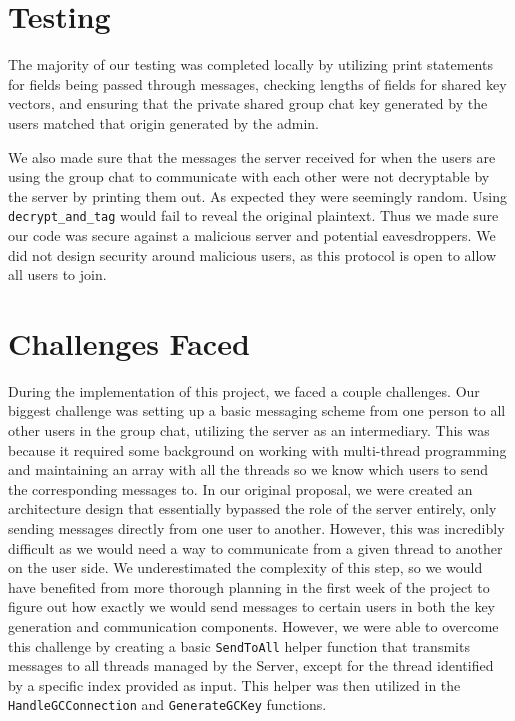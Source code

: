 \documentclass[sigconf]{acmart}
\begin{document}
\section{Testing}
The majority of our testing was completed locally by utilizing print statements for fields being passed through messages, checking lengths of fields for shared key vectors, and ensuring that the private shared group chat key generated by the users matched that origin generated by the admin.

We also made sure that the messages the server received for when the users are using the group chat to communicate with each other were not decryptable by the server by printing them out. As expected they were seemingly random. Using \texttt{decrypt\_and\_tag} would fail to reveal the original plaintext. Thus we made sure our code was secure against a malicious server and potential eavesdroppers. We did not design security around malicious users, as this protocol is open to allow all users to join. 

\section{Challenges Faced}
During the implementation of this project, we faced a couple challenges. Our biggest challenge was setting up a basic messaging scheme from one person to all other users in the group chat, utilizing the server as an intermediary. This was because it required some background on working with multi-thread programming and maintaining an array with all the threads so we know which users to send the corresponding messages to. In our original proposal, we were created an architecture design that essentially bypassed the role of the server entirely, only sending messages directly from one user to another. However, this was incredibly difficult as we would need a way to communicate from a given thread to another on the user side. We underestimated the complexity of this step, so we would have benefited from more thorough planning in the first week of the project to figure out how exactly we would send messages to certain users in both the key generation and communication components. However, we were able to overcome this challenge by creating a basic \texttt{SendToAll} helper function that transmits messages to all threads managed by the Server, except for the thread identified by a specific index provided as input. This helper was then utilized in the \texttt{HandleGCConnection} and \texttt{GenerateGCKey} functions.
\end{document}
